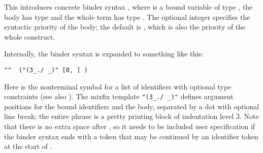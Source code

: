 \begin{isabellebody}
\begin{isamarkuptext}
  This introduces concrete binder syntax , where
   is a bound variable of type , the body  has type  and the whole term has type .
  The optional integer  specifies the syntactic priority of
  the body; the default is , which is also the priority of
  the whole construct.

  Internally, the binder syntax is expanded to something like this:
  \begin{center}
  \verb|"|\verb|"  ("(3|\verb|_./ _)" [0, |\verb|] |\verb|)|
  \end{center}

  Here \hyperlink{syntax.inner.idts}{\mbox{}} is the nonterminal symbol for a list of
  identifiers with optional type constraints (see also
  ).  The mixfix template \verb|"(3|\verb|_./ _)"| defines argument positions
  for the bound identifiers and the body, separated by a dot with
  optional line break; the entire phrase is a pretty printing block of
  indentation level 3.  Note that there is no extra space after , so it needs to be included user specification if the binder
  syntax ends with a token that may be continued by an identifier
  token at the start of \hyperlink{syntax.inner.idts}{\mbox{}}.


\end{isamarkuptext}
\end{isabellebody}
